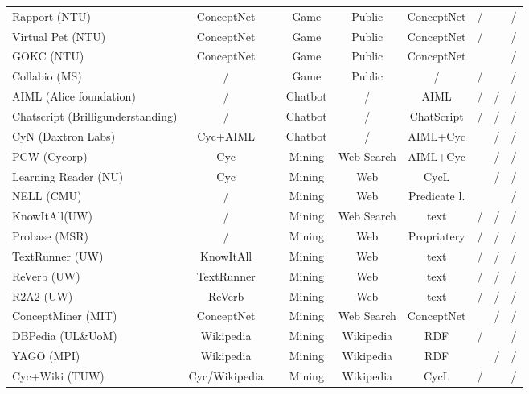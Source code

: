 \begin{landscape}
\begin{table}[htb]
\begin{adjustbox}{width=1.4\textwidth}
\begin{tabular}{lclcccccc}
		Rapport (NTU) & ConceptNet &  \parencite{Kuo2009}  & Game & Public  & ConceptNet  & /  & \checkmark  & /  \\
		Virtual Pet (NTU) & ConceptNet  &  \parencite{Kuo2009}  & Game &  Public & ConceptNet  & /  & \checkmark  & /  \\
		GOKC (NTU) & ConceptNet  & \parencite{Kuo2010}  & Game & Public  & ConceptNet  & \checkmark  & \checkmark  & /  \\
		Collabio (MS) & /  & \parencite{Bernstein2010}  & Game & Public  & /  & /  & \checkmark  & /  \\
		AIML (Alice foundation) & /  & \parencite{Wallace2003}  & Chatbot & /  & AIML  & /  & /  & /  \\
		Chatscript (Brilligunderstanding) & /  & \parencite{Wilcox2011}  & Chatbot & /  & ChatScript  & /  & /  & /  \\
		CyN (Daxtron Labs) & Cyc+AIML  & \parencite{Wilcox2011}  & Chatbot & /  & AIML+Cyc  & \checkmark  & /  & /  \\
	    PCW (Cycorp) & Cyc  & \parencite{Matuszek2004}  & Mining & Web Search  & AIML+Cyc  & \checkmark  & /  & /  \\
 		Learning Reader (NU) & Cyc & \parencite{Forbus2007} & Mining & Web & CycL & \checkmark & / & / \\
		NELL (CMU) & / & \parencite{Mitchell2015} & Mining & Web & Predicate l. & \checkmark & \checkmark & / \\ 
		KnowItAll(UW) & / & \parencite{Etzioni2004} & Mining & Web Search & text & / & / & / \\
		Probase (MSR) & / & \parencite{Wu2012}  & Mining & Web & Propriatery & / & / & / \\
        TextRunner (UW) & KnowItAll & \parencite{Soderland2007} & Mining & Web & text & / & / & / \\
		ReVerb (UW) & TextRunner & \parencite{Fader2011} & Mining & Web & text & / & / & / \\
		R2A2 (UW) & ReVerb & \parencite{Etzioni2011} & Mining & Web & text & / & / & / \\
		ConceptMiner (MIT) & ConceptNet & \parencite{Eslick2006} &Mining & Web Search & ConceptNet & \checkmark & / & / \\ 
		DBPedia (UL\&UoM) & Wikipedia & \parencite{Lehmann2015} & Mining & Wikipedia &  RDF & / &\checkmark & / \\
		YAGO (MPI) & Wikipedia & \parencite{Suchanek2008} & Mining & Wikipedia &  RDF & \checkmark & / & / \\
		Cyc+Wiki (TUW) & Cyc/Wikipedia & \parencite{Medelyan2008} & Mining & Wikipedia &  CycL & / &\checkmark & / \\

\end{tabular}
\end{adjustbox}
\end{table}
\end{landscape}
